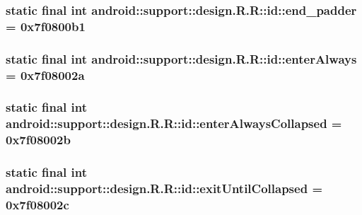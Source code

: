 \hypertarget{classandroid_1_1support_1_1design_1_1_r_1_1id_711cb276d353e9b4f29b92df8d6f15d9}{
\subsubsection[{end\_\-padder}]{\setlength{\rightskip}{0pt plus 5cm}static final int android::support::design.R.R::id::end\_\-padder = 0x7f0800b1}}
\label{classandroid_1_1support_1_1design_1_1_r_1_1id_711cb276d353e9b4f29b92df8d6f15d9}


\hypertarget{classandroid_1_1support_1_1design_1_1_r_1_1id_d12833974138ddf3593adb18835a5adc}{
\subsubsection[{enterAlways}]{\setlength{\rightskip}{0pt plus 5cm}static final int android::support::design.R.R::id::enterAlways = 0x7f08002a}}
\label{classandroid_1_1support_1_1design_1_1_r_1_1id_d12833974138ddf3593adb18835a5adc}


\hypertarget{classandroid_1_1support_1_1design_1_1_r_1_1id_861d5ccc56625efe258ec2c4c1778e35}{
\subsubsection[{enterAlwaysCollapsed}]{\setlength{\rightskip}{0pt plus 5cm}static final int android::support::design.R.R::id::enterAlwaysCollapsed = 0x7f08002b}}
\label{classandroid_1_1support_1_1design_1_1_r_1_1id_861d5ccc56625efe258ec2c4c1778e35}


\hypertarget{classandroid_1_1support_1_1design_1_1_r_1_1id_91841646b1821f607b679d54c1f0af32}{
\subsubsection[{exitUntilCollapsed}]{\setlength{\rightskip}{0pt plus 5cm}static final int android::support::design.R.R::id::exitUntilCollapsed = 0x7f08002c}}
\label{classandroid_1_1support_1_1design_1_1_r_1_1id_91841646b1821f607b679d54c1f0af32}


